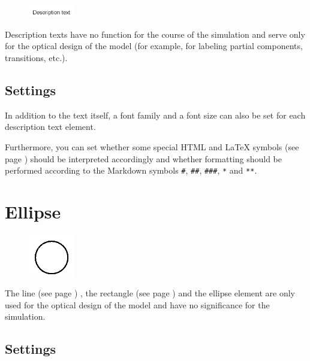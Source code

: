 \begin{figure}
\vspace{-22pt}
\includegraphics[width=2cm]{imageModelElementText.png}
\vspace{-22pt}
\end{figure}

Description texts have no function for the course of the simulation
and serve only for the optical design of the model
(for example, for labeling partial components, transitions, etc.).

\subsection*{Settings}

In addition to the text itself, a font family and a font size can also be set for each description text element.

Furthermore, you can set whether some special HTML and LaTeX symbols (see page \pageref{ref:TextEntities}) should
be interpreted accordingly and whether formatting should be performed according to the Markdown symbols
\texttt{\#}, \texttt{\#\#}, \texttt{\#\#\#}, \texttt{*} and \texttt{**}.


\section{Ellipse}
\label{ref:ModelElementEllipse}

\begin{figure}
\vspace{-22pt}
\includegraphics[width=2cm]{imageModelElementEllipse.png}
\vspace{-22pt}
\end{figure}

The line (see page \pageref{ref:ModelElementLine}) , the rectangle (see page \pageref{ref:ModelElementRectangle}) 
and the ellipse element are only used for the optical design of the model and have no significance for the simulation.

\subsection*{Settings}

